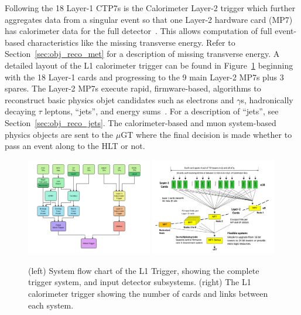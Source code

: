 Following the 18 Layer-1 CTP7s is the Calorimeter Layer-2 trigger which further aggregates
data from a singular event so that one Layer-2 hardware card (MP7) has calorimeter data for
the full detector~\cite{Cadamuro:2017slr}. This allows computation
of full event-based characteristics like the missing transverse energy. Refer to
Section~\ref{sec:obj_reco_met} for a description of missing transverse energy. A detailed
layout of the L1 calorimeter trigger can be found in Figure~\ref{fig:cms_l1t} beginning
with the 18 Layer-1 cards and progressing to the 9 main Layer-2 MP7s plus 3 spares.
The Layer-2 MP7s execute rapid, firmware-based, algorithms to reconstruct basic physics
objet candidates such as electrons and $\gamma$s, hadronically decaying $\tau$ leptons, 
``jets'', and energy sums~\cite{Cadamuro:2017slr}. For a description of ``jets'', 
see Section~\ref{sec:obj_reco_jets}.
The calorimeter-based and muon system-based physics objects are sent to the $\mu$GT
where the final decision is made whether to pass an event along to the HLT or not.

\begin{figure}[htbp]
\centering
     \includegraphics[width=0.49\textwidth]{cms_and_lhc/plots/cms_l1t_system.pdf}
     \includegraphics[width=0.49\textwidth]{cms_and_lhc/plots/cms_l1t_hardware.pdf}
     \caption{
(left) System flow chart of the L1 Trigger, showing the complete trigger system, and
input detector subsystems.
(right) The L1 calorimeter trigger showing the number of cards and links between
each system.
     }
     \label{fig:cms_l1t}
\end{figure}

